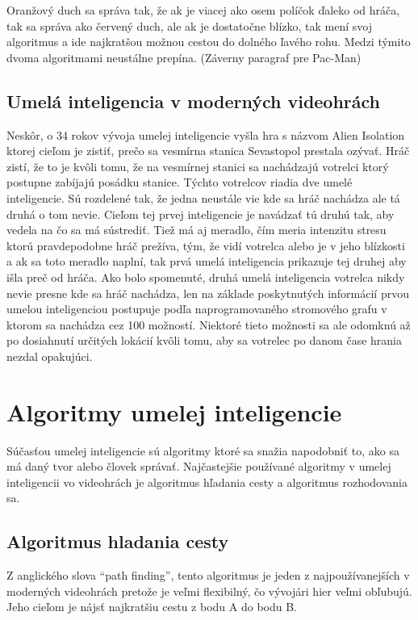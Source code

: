 \documentclass[10pt,oneside,slovak,a4paper]{article}
\begin{document}
Oranžový duch sa správa tak, že ak je viacej ako osem políčok ďaleko od hráča, tak sa správa ako červený duch, ale ak je dostatočne blízko, tak mení svoj algoritmus a ide najkratšou možnou cestou do dolného ľavého rohu. Medzi týmito dvoma algoritmami neustálne prepína.
(Záverny paragraf pre Pac-Man)

\subsection{Umelá inteligencia v moderných videohrách} \label{kapitola2.3}
Neskôr, o 34 rokov vývoja umelej inteligencie vyšla hra s názvom Alien Isolation ktorej cieľom je zistiť, prečo sa vesmírna stanica Sevastopol prestala ozývať. Hráč zistí, že to je kvôli tomu, že na vesmírnej stanici sa nachádzajú votrelci ktorý postupne zabíjajú posádku stanice. Týchto votrelcov riadia dve umelé inteligencie. Sú rozdelené tak, že jedna neustále vie kde sa hráč nachádza ale tá druhá o tom nevie. Cieľom tej prvej inteligencie je navádzať tú druhú tak, aby vedela na čo sa má sústrediť. Tiež má aj meradlo, čím meria intenzitu stresu ktorú pravdepodobne hráč prežíva, tým, že vidí votrelca alebo je v jeho blízkosti a ak sa toto meradlo naplní, tak prvá umelá inteligencia prikazuje tej druhej aby išla preč od hráča. Ako bolo spomenuté, druhá umelá inteligencia votrelca nikdy nevie presne kde sa hráč nachádza, len na základe poskytnutých informácií prvou umelou inteligenciou postupuje podľa naprogramovaného stromového grafu v ktorom sa nachádza cez 100 možností. Niektoré tieto možnosti sa ale odomknú až po dosiahnutí určitých lokácií kvôli tomu, aby sa votrelec po danom čase hrania nezdal opakujúci.


\section{Algoritmy umelej inteligencie} \label{kapitola3}
Súčasťou umelej inteligencie sú algoritmy ktoré sa snažia napodobniť to, ako sa má daný tvor alebo človek správať. Najčastejšie používané algoritmy v umelej inteligencii vo videohrách je algoritmus hľadania cesty a algoritmus rozhodovania sa.

\subsection{Algoritmus hladania cesty} \label{kapitola3.1}
Z anglického slova “path finding”, tento algoritmus je jeden z najpoužívanejších v moderných videohrách pretože je veľmi flexibilný, čo vývojári hier veľmi obľubujú. Jeho cieľom je nájsť najkratšiu cestu z bodu A do bodu B. 
\end{document}
